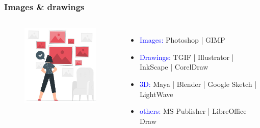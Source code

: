 \documentclass[newPxFont,sthlmFooter]{beamer}
\newcommand{\fs}{\footnotesize}
\begin{document}
\begin{frame}\frametitle{Images \& drawings}
  \begin{columns}[T,onlytextwidth]
  \begin{figure}
    \centering
    \includegraphics[width=2in]{figs/img} 
  \end{figure}
          \vspace{1cm}
  \begin{itemize}
  \fs
	\item \textcolor{blue}{Images:} Photoshop | GIMP
	\item \textcolor{blue}{Drawings:} TGIF | Illustrator | InkScape | CorelDraw
	\item \textcolor{blue}{3D:} Maya | Blender | Google Sketch | LightWave
	\item \textcolor{blue}{others:} MS Publisher | LibreOffice Draw
	\end{itemize}
  \vspace{-2cm}
  \end{columns}
\end{frame}
\end{document}

